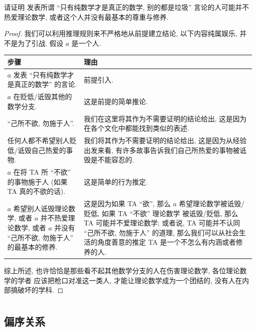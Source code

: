 \documentclass[10pt,UTF8]{book} %
\begin{document}
\newpage
\begin{example}
    请证明 {\kaishu 发表所谓 “只有纯数学才是真正的数学, 别的都是垃圾” 言论的人可能并不热爱理论数学,
    或者这个人并没有最基本的尊重与修养}.
    \begin{proof}
        我们可以利用推理规则来不严格地从前提建立结论, 以下内容纯属娱乐, 并不是为了引战. 
        假设 $a$ 是一个人.
        {\begin{longtable}{p{}p{}}
            \toprule
            \textbf{步骤} & \textbf{理由} \\
            \midrule
            \endhead
            
            \bottomrule
            \endfoot
        
            $a$ 发表 “只有纯数学才是真正的数学” 的言论. & 前提引入. \\
            $a$ 在贬低/诋毁其他的数学分支. & 这是前提的简单推论. \\ 
            “己所不欲, 勿施于人”. & 我们在这里将其作为不需要证明的结论给出, 
            这是因为在各个文化中都能找到类似的表述. \\
            任何人都不希望别人贬低/诋毁自己热爱的事物. & 我们将其作为不需要证明的结论给出, 
            这是因为从经验出发来看, 有许多故事告诉我们自己所热爱的事物被诋毁是不能容忍的. \\ 
            $a$ 在将 TA 所 “不欲” 的事物施于人 (如果 TA 真的不欲的话). & 这是简单的行为推定. \\ 
            $a$ 希望别人诋毁理论数学, 或者 $a$ 并不热爱理论数学, 或者 $a$ 并没有 “己所不欲, 勿施于人” 的最基本的修养. 
            & 这是因为如果 TA “欲”, 那么 $a$ 希望理论数学被诋毁/贬低, 如果 TA “不欲” 理论数学
            被诋毁/贬低, 那么 TA 可能并不爱理论数学; 或者说, TA 可能并不认同 “己所不欲, 勿施于人”
            的道理, 那么我们可以从社会生活的角度善意的推定 TA 是一个不怎么有内涵或者修养的人.\\
        \end{longtable}}
        综上所述, 也许恰恰是那些看不起其他数学分支的人在伤害理论数学, 各位理论数学的学者
        应该把枪口对准这一类人, 才能让理论数学成为一个团结的, 没有人在内部搞破坏的学科.
    \end{proof}
\end{example}

\chapter{}
\section{偏序关系}
\end{document}

